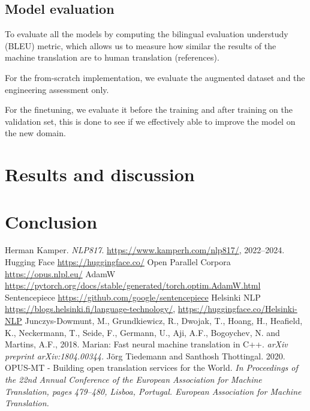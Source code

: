 \subsection{Model evaluation}
To evaluate all the models by computing the bilingual evaluation understudy (BLEU) metric, which allows us to measure how similar the results of the machine translation are to human translation (references).

For the from-scratch implementation, we evaluate the augmented dataset and the engineering assessment only. 

For the finetuning, we evaluate it before the training and after training on the validation set, this is done to see if we effectively able to improve the model on the new domain.



\section{Results and discussion}

\section{Conclusion}

\begin{thebibliography}{1}

 Herman Kamper. \emph{NLP817}. \href{https://www.kamperh.com/nlp817/}{https://www.kamperh.com/nlp817/}, 2022--2024.
 Hugging Face \href{https://huggingface.co/}{https://huggingface.co/}
 Open Parallel Corpora \href{https://opus.nlpl.eu/}{https://opus.nlpl.eu/}
 AdamW \href{https://pytorch.org/docs/stable/generated/torch.optim.AdamW.html}{https://pytorch.org/docs/stable/generated/torch.optim.AdamW.html}
 Sentencepiece \href{https://github.com/google/sentencepiece}{https://github.com/google/sentencepiece}
 Helsinki NLP \href{https://blogs.helsinki.fi/language-technology/}{https://blogs.helsinki.fi/language-technology/}, \href{https://huggingface.co/Helsinki-NLP}{https://huggingface.co/Helsinki-NLP}
 Junczys-Dowmunt, M., Grundkiewicz, R., Dwojak, T., Hoang, H., Heafield, K., Neckermann, T., Seide, F., Germann, U., Aji, A.F., Bogoychev, N. and Martins, A.F., 2018. Marian: Fast neural machine translation in C++. \textit{arXiv preprint arXiv:1804.00344.}
 Jörg Tiedemann and Santhosh Thottingal. 2020. OPUS-MT - Building open translation services for the World. \textit{In Proceedings of the 22nd Annual Conference of the European Association for Machine Translation, pages 479–480, Lisboa, Portugal. European Association for Machine Translation.}
\end{thebibliography}